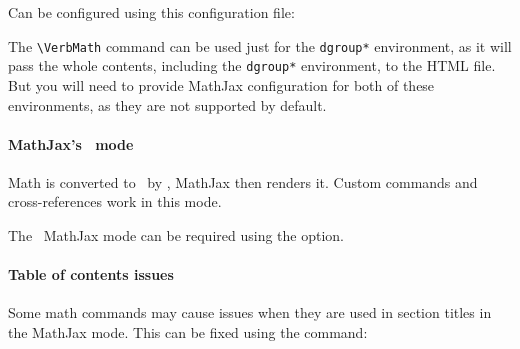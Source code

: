 
Can be configured using this configuration file:

\begin{texsource}
 
\EndPreamble
\end{texsource}

The \verb|\VerbMath| command can be used just for the \verb|dgroup*| environment, as it will pass the
whole contents, including the \verb|dgroup*| environment, to the HTML file. But you will need to 
provide MathJax configuration for both of these environments, as they are not supported by default.



\paragraph{MathJax's \mathml\ mode}

Math is converted to \mathml\ by \texfourht, MathJax then renders it. Custom
commands and cross-references work in this mode.

The \mathml\ MathJax mode can be required using the  option.

\paragraph{Table of contents issues}

Some math commands may cause issues when they are used in section titles in the MathJax mode. 
This can be fixed using the \texcommand{\fixmathjaxtoc} command:

\begin{texsource}
\fixmathjaxtoc\int
\end{texsource}

